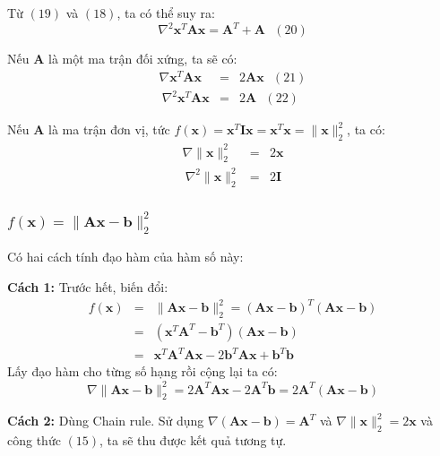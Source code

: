 \documentclass[12pt]{article}
\begin{document}
 
Từ $(19)$ và $(18)$, ta có thể suy ra: 
\begin{equation*} 
\nabla^2 \mathbf{x}^T\mathbf{Ax} = \mathbf{A}^T + \mathbf{A} ~~~ (20) 
\end{equation*} 
 
Nếu $\mathbf{A}$ là một ma trận đối xứng, ta sẽ có: 
\begin{eqnarray} 
\nabla \mathbf{x}^T\mathbf{A}\mathbf{x} &=& 2\mathbf{Ax}~~~(21)\\\ 
\nabla^2 \mathbf{x}^T\mathbf{Ax} &=& 2\mathbf{A} ~~~(22) 
\end{eqnarray} 
 
Nếu $\mathbf{A}$ là ma trận đơn vị, tức $f(\mathbf{x}) = \mathbf{x}^T\mathbf{Ix} = \mathbf{x}^T\mathbf{x} = \|\mathbf{x}\|_2^2$, ta có: 
\begin{eqnarray} 
\nabla \|\mathbf{x}\|_2^2 &=& 2\mathbf{x}\\\ 
\nabla^2 \|\mathbf{x}\|_2^2 &=& 2\mathbf{I} 
\end{eqnarray} 
 
 
\subsubsection{$f(\mathbf{x}) = \|\mathbf{Ax} - \mathbf{b}\|_2^2 $}
Có hai cách tính đạo hàm của hàm số này: 
 
\textbf{Cách 1:} 
Trước hết, biến đổi: 
\begin{eqnarray} 
f(\mathbf{x}) &=& \|\mathbf{Ax} - \mathbf{b}\|_2^2 = (\mathbf{Ax} - \mathbf{b})^T(\mathbf{Ax} - \mathbf{b}) \\\ 
&=& (\mathbf{x}^T\mathbf{A}^T - \mathbf{b}^T) (\mathbf{Ax} - \mathbf{b}) \\\ 
&=& \mathbf{x}^T\mathbf{A}^T\mathbf{Ax} - 2 \mathbf{b}^T\mathbf{Ax} + \mathbf{b}^T\mathbf{b} 
\end{eqnarray} 
Lấy đạo hàm cho từng số hạng rồi cộng lại ta có:  
\begin{equation*} 
\nabla \|\mathbf{Ax} - \mathbf{b}\|_2^2 = 2\mathbf{A}^T\mathbf{A}\mathbf{x} - 2\mathbf{A}^T\mathbf{b} = 2\mathbf{A}^T(\mathbf{Ax} - \mathbf{b}) 
\end{equation*} 
 
\textbf{Cách 2:} Dùng Chain rule. 
Sử dụng $\nabla (\mathbf{Ax} - \mathbf{b}) = \mathbf{A}^T$ và $\nabla \|\mathbf{x}\|_2^2 = 2\mathbf{x}$ và công thức $(15)$, ta sẽ thu được kết quả tương tự.  
 
 
\end{document}
